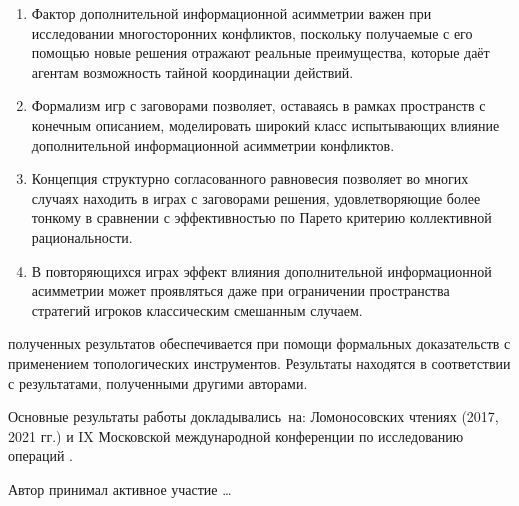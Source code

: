 {}
\begin{enumerate}[beginpenalty=10000] %
  \item Фактор дополнительной информационной асимметрии важен при исследовании многосторонних конфликтов, поскольку получаемые с его помощью новые решения отражают реальные преимущества, которые даёт агентам возможность тайной координации действий.
  \item Формализм игр с заговорами позволяет, оставаясь в рамках пространств с конечным описанием, моделировать широкий класс испытывающих влияние дополнительной информационной асимметрии конфликтов.
  \item Концепция структурно согласованного равновесия позволяет во многих случаях находить в играх с заговорами решения, удовлетворяющие более тонкому в сравнении с эффективностью по Парето критерию коллективной рациональности.
  \item В повторяющихся играх эффект влияния дополнительной информационной асимметрии может проявляться даже при ограничении пространства стратегий игроков классическим смешанным случаем.
\end{enumerate}

{\reliability} полученных результатов обеспечивается при помощи формальных доказательств с применением топологических инструментов. Результаты находятся в соответствии с результатами, полученными другими авторами.


{\probation}
Основные результаты работы докладывались~на: Ломоносовских чтениях (2017, 2021 гг.) \cite{ownlmr2017, ownlmr2021} и IX Московской международной конференции по исследованию операций \cite{ownorm2018}.

{\contribution} Автор принимал активное участие \ldots

